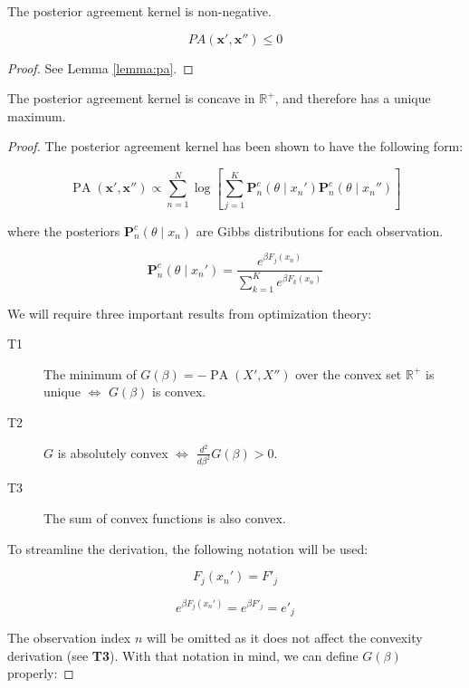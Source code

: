 \begin{theorem}
    The posterior agreement kernel is non-negative.

    $$
    PA(\bm{x}', \bm{x}'') \leq 0
    $$  
\end{theorem}

\begin{proof}
    See Lemma \ref{lemma:pa}.
\end{proof}

\begin{theorem}
    The posterior agreement kernel is concave in $\mathbb{R}^+$, and therefore
    has a unique maximum.
\end{theorem}

\begin{proof}

The posterior agreement kernel has been shown to have the following form:

$$
\operatorname{PA}\left(\bm{x}', \bm{x}'' \right) \propto \sum_{n=1}^N \log \left[ \sum_{j=1}^K \mathbf{P}_n^c(\theta \mid x_n') \mathbf{P}_n^c(\theta \mid x_n'') \right]
$$

where the posteriors $\mathbf{P}_n^c(\theta \mid x_n)$ are Gibbs distributions for each observation.

$$
\mathbf{P}_n^c(\theta \mid x_n') = \frac{e^{\beta F_j(x_n)}}{\sum_{k=1}^K e^{\beta F_k(x_n)}}
$$

We will require three important results from optimization theory:

\begin{description}
    \item[T1] The minimum of $G(\beta) = -\operatorname{PA}(X', X'')$ over the convex set $\mathbb{R}^+$ is unique $\iff$ $G(\beta)$ is convex.
    \item[T2] $G$ is absolutely convex $\iff$ $\frac{d^2}{d \beta^2} G(\beta) > 0$.
    \item[T3] The sum of convex functions is also convex.
\end{description}


To streamline the derivation, the following notation will be used:

$$
F_j(x_n') = F'_j
$$

$$
e^{\beta F_j(x_n')} = e^{\beta F'_j} = e'_j
$$

The observation index $n$ will be omitted as it does not affect the convexity derivation (see \textbf{T3}). With that notation in mind, we can define $G(\beta)$ properly:


\end{proof}
